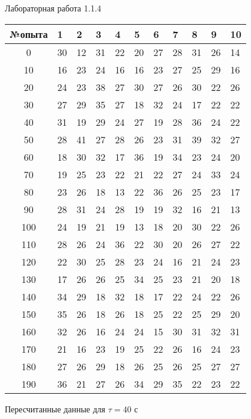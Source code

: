 \documentclass{astroedu-lab}
\begin{document}
\begin{problem}{\large Лабораторная работа 1.1.4}
\begin{center}
\begin{tabular}[t]{|c|l|l|l|l|l|l|l|l|l|l|}
\hline
№опыта & 1 & 2 & 3 & 4 & 5 & 6 & 7 & 8 & 9 & 10 \\
\hline
0 & 30 & 12 & 31 & 22 & 20 & 27 & 28 & 31 & 26 & 14\\
10 & 16 & 23 & 24 & 16 & 16 & 23 & 27 & 25 & 29 & 16\\
20 & 24 & 23 & 38 & 27 & 30 & 27 & 26 & 30 & 22 & 26\\
30 & 27 & 29 & 35 & 27 & 18 & 32 & 24 & 17 & 22 & 22\\
40 & 31 & 19 & 29 & 24 & 27 & 19 & 28 & 36 & 24 & 22\\
50 & 28 & 41 & 27 & 28 & 26 & 23 & 31 & 39 & 32 & 27\\
60 & 18 & 30 & 32 & 17 & 36 & 19 & 34 & 23 & 24 & 20\\
70 & 19 & 25 & 23 & 22 & 21 & 22 & 27 & 24 & 33 & 24\\
80 & 23 & 26 & 18 & 13 & 22 & 36 & 26 & 25 & 23 & 17\\
90 & 28 & 31 & 24 & 28 & 19 & 19 & 32 & 16 & 21 & 13\\
100 & 24 & 19 & 21 & 19 & 13 & 18 & 20 & 30 & 22 & 26\\
110 & 28 & 26 & 24 & 36 & 22 & 30 & 20 & 26 & 27 & 22\\
120 & 22 & 30 & 25 & 28 & 23 & 24 & 16 & 21 & 24 & 23\\
130 & 17 & 26 & 26 & 25 & 34 & 25 & 23 & 21 & 20 & 18\\
140 & 34 & 29 & 18 & 32 & 18 & 17 & 22 & 24 & 22 & 26\\
150 & 35 & 26 & 18 & 26 & 18 & 25 & 22 & 25 & 29 & 20\\
160 & 32 & 26 & 16 & 24 & 24 & 15 & 30 & 31 & 32 & 31\\
170 & 21 & 16 & 23 & 19 & 25 & 22 & 26 & 16 & 24 & 23\\
180 & 27 & 26 & 29 & 18 & 26 & 25 & 26 & 25 & 27 & 27\\
190 & 36 & 21 & 27 & 26 & 34 & 29 & 35 & 22 & 23 & 22\\
\hline
\end{tabular}
\end{center}

\begin{center}
Пересчитанные данные для $\tau = 40$ с


\end{center}
\end{problem}
\end{document}

